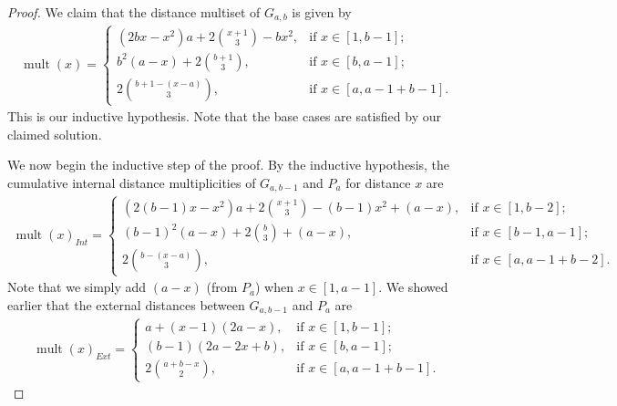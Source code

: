 \documentclass[12]{article}
\DeclareMathOperator{\mult}{mult}
\theoremstyle{definition}
\begin{document}
\begin{proof}
	
	
	We claim that the distance multiset of $G_{a,b}$ is given by
	\begin{align*}
		\mult(x) = 
		\begin{cases}
			(2bx-x^2)a + 2{x+1 \choose 3} - bx^2, &\text{if } x \in [1,b-1];	\\
			b^2(a-x) + 2{b+1 \choose 3}, &\text{if }x \in [b,a-1];	\\
			2{b+1 - (x-a) \choose 3}, &\text{if }x \in [a,a-1+b-1].
		\end{cases}
	\end{align*}
	This is our inductive hypothesis.  Note that the base cases are satisfied by our claimed solution.
	
	
	
	We now begin the inductive step of the proof.  By the inductive hypothesis, the cumulative internal distance multiplicities of $G_{a,b-1}$ and $P_a$ for distance $x$ are
		\begin{align*}
			\mult(x)_{Int} = 
			\begin{cases}
				(2(b-1)x-x^2)a + 2{x+1 \choose 3} - (b-1)x^2 + (a-x), &\text{if } x \in [1,b-2];	\\
				(b-1)^2(a-x) + 2{b \choose 3} + (a-x), &\text{if }x \in [b-1,a-1];	\\
				2{b - (x-a) \choose 3}, &\text{if }x \in [a,a-1+b-2].
			\end{cases}
		\end{align*}
	Note that we simply add $(a-x)$ (from $P_a$) when $x \in [1,a-1]$.
	We showed earlier that the external distances between $G_{a,b-1}$ and $P_a$ are
	\begin{align*}
		\mult(x)_{Ext} =
		\begin{cases}
			a+(x-1)(2a-x), &\text{if } x \in [1,b-1];	\\
			(b-1)(2a-2x+b), &\text{if } x \in [b,a-1];	\\
			2{a+b-x \choose 2}, &\text{if } x \in [a,a-1+b-1].
		\end{cases}
	\end{align*}
	

\end{proof}
\end{document}

